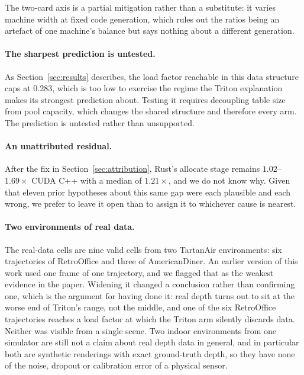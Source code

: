 \documentclass[11pt]{article}
\begin{document}
The two-card axis is a partial mitigation rather than a substitute: it varies
machine width at fixed code generation, which rules out the ratios being an
artefact of one machine's balance but says nothing about a different generation.

\paragraph{The sharpest prediction is untested.} As Section~\ref{sec:results}
describes, the load factor reachable in this data structure caps at 0.283, which
is too low to exercise the regime the Triton explanation makes its strongest
prediction about. Testing it requires decoupling table size from pool capacity,
which changes the shared structure and therefore every arm. The prediction is
untested rather than unsupported.

\paragraph{An unattributed residual.} After the fix in
Section~\ref{sec:attribution}, Rust's allocate stage remains $1.02$--$1.69\times$
CUDA C++ with a median of $1.21\times$, and we do not know why. Given that eleven prior hypotheses about this
same gap were each plausible and each wrong, we prefer to leave it open than to
assign it to whichever cause is nearest.

\paragraph{Two environments of real data.} The real-data cells are nine valid
cells from two TartanAir environments: six trajectories of RetroOffice and
three of AmericanDiner. An earlier version of this work used one frame of one
trajectory, and we flagged that as the weakest evidence in the paper. Widening
it changed a conclusion rather than confirming one, which is the argument for
having done it: real depth turns out to sit at the worse end of Triton's range,
not the middle, and one of the six RetroOffice trajectories reaches a load
factor at which the Triton arm silently discards data. Neither was visible from
a single scene. Two indoor environments from one simulator are still not a
claim about real depth data in general, and in particular both are synthetic
renderings with exact ground-truth depth, so they have none of the noise,
dropout or calibration error of a physical sensor.
\end{document}

